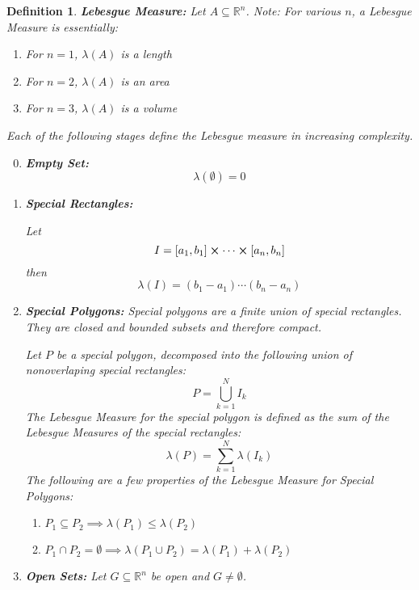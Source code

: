 \documentclass[]{article}
\newcommand{\R}{\mathbb{R}}
\newtheorem{definition}{Definition}
\begin{document}
\begin{definition}
    \emph{\textbf{Lebesgue Measure:}}
    Let $A \subseteq \R^n$. 
    \emph{Note:} 
    For various $n$, a Lebesgue Measure is essentially:\begin{enumerate}
        \item For $n=1$, $\lambda(A)$ is a length
        \item For $n=2$, $\lambda(A)$ is an area
        \item For $n=3$, $\lambda(A)$ is a volume
    \end{enumerate}
    Each of the following stages define the Lebesgue measure in increasing complexity. 
    \begin{enumerate}
        \setcounter{enumi}{-1}
        \item \emph{\textbf{Empty Set:}} \[
                \lambda(\emptyset) = 0
            \] 
        \item \emph{\textbf{Special Rectangles:}}
        
            Let \[
                I = [a_1, b_1] \cross \cdots \cross [a_n, b_n]
            \] then \[
                \lambda(I) = (b_1 - a_1) \cdots (b_n - a_n)
            \]
            \item \emph{\textbf{Special Polygons:}}
            Special polygons are a finite union of special rectangles. 
            They are closed and bounded subsets and therefore compact. 
            
            Let $P$ be a special polygon, decomposed into the following union of nonoverlaping special rectangles: \[
                P = \bigcup_{k=1}^{N} I_k
            \] The Lebesgue Measure for the special polygon is defined as the sum of the Lebesgue Measures of the special rectangles:\[
                \lambda(P) = \sum_{k=1}^{N} \lambda(I_k)
            \] The following are a few properties of the Lebesgue Measure for Special Polygons:\begin{enumerate}
                \item $P_1 \subseteq P_2 \implies \lambda(P_1) \leq \lambda(P_2)$
                \item $P_1 \cap P_2 = \emptyset \implies \lambda(P_1 \cup P_2) = \lambda(P_1) + \lambda(P_2)$
            \end{enumerate}
        \item \emph{\textbf{Open Sets:}}
            Let $G \subseteq \R^n$ be open and $G \neq \emptyset$. 


\end{enumerate}
\end{definition}
\end{document}
